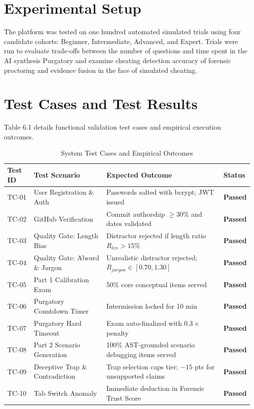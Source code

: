 \section{Experimental Setup}
The platform was tested on one hundred automated simulated trials using four candidate cohorts: Beginner, Intermediate, Advanced, and Expert. Trials were run to evaluate trade-offs between the number of questions and time spent in the AI synthesis Purgatory and examine cheating detection accuracy of forensic proctoring and evidence fusion in the face of simulated cheating.

\section{Test Cases and Test Results}
Table 6.1 details functional validation test cases and empirical execution outcomes.

\begin{table}[htbp]
\caption{System Test Cases and Empirical Outcomes}
\centering
\small
\begin{tabular}{|p{}|p{}|p{}|p{}|}
\hline
\textbf{Test ID} & \textbf{Test Scenario} & \textbf{Expected Outcome} & \textbf{Status} \\
\hline
TC-01 & User Registration \& Auth & Passwords salted with bcrypt; JWT issued & \textbf{Passed} \\
\hline
TC-02 & GitHub Verification & Commit authorship $\ge 30\%$ and dates validated & \textbf{Passed} \\
\hline
TC-03 & Quality Gate: Length Bias & Distractor rejected if length ratio $R_{len} > 15\%$ & \textbf{Passed} \\
\hline
TC-04 & Quality Gate: Absurd \& Jargon & Unrealistic distractor rejected; $R_{jargon} \in [0.70, 1.30]$ & \textbf{Passed} \\
\hline
TC-05 & Part 1 Calibration Exam & 50\% core conceptual items served & \textbf{Passed} \\
\hline
TC-06 & Purgatory Countdown Timer & Intermission locked for 10 min & \textbf{Passed} \\
\hline
TC-07 & Purgatory Hard Timeout & Exam auto-finalized with $0.3\times$ penalty & \textbf{Passed} \\
\hline
TC-08 & Part 2 Scenario Generation & 100\% AST-grounded scenario debugging items served & \textbf{Passed} \\
\hline
TC-09 & Deceptive Trap \& Contradiction & Trap selection caps tier; $-15$ pts for unsupported claims & \textbf{Passed} \\
\hline
TC-10 & Tab Switch Anomaly & Immediate deduction in Forensic Trust Score & \textbf{Passed} \\
\hline
\end{tabular}
\end{table}

